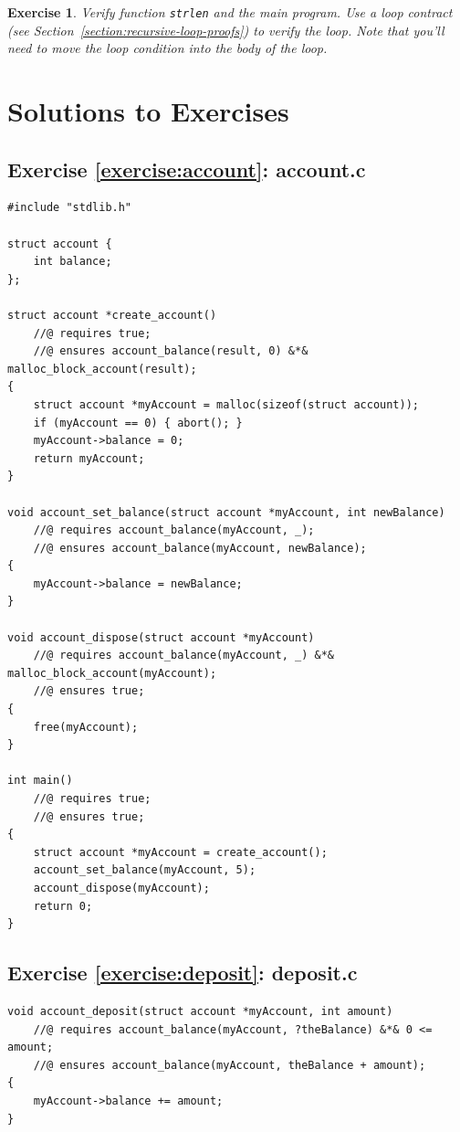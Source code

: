\documentclass{article}
\newtheorem{exercise}{Exercise}
\begin{document}
\begin{exercise}\label{exercise:strlen}
Verify function \lstinline!strlen! and the main program. Use a loop contract (see Section~\ref{section:recursive-loop-proofs}) to verify the loop.
Note that you'll need to move the loop condition into the body of the loop.
\end{exercise}

\section{Solutions to Exercises}

\subsection{Exercise \ref{exercise:account}: account.c}

\begin{lstlisting}
#include "stdlib.h"

struct account {
    int balance;
};

struct account *create_account()
    //@ requires true;
    //@ ensures account_balance(result, 0) &*& malloc_block_account(result);
{
    struct account *myAccount = malloc(sizeof(struct account));
    if (myAccount == 0) { abort(); }
    myAccount->balance = 0;
    return myAccount;
}

void account_set_balance(struct account *myAccount, int newBalance)
    //@ requires account_balance(myAccount, _);
    //@ ensures account_balance(myAccount, newBalance);
{
    myAccount->balance = newBalance;
}

void account_dispose(struct account *myAccount)
    //@ requires account_balance(myAccount, _) &*& malloc_block_account(myAccount);
    //@ ensures true;
{
    free(myAccount);
}

int main()
    //@ requires true;
    //@ ensures true;
{
    struct account *myAccount = create_account();
    account_set_balance(myAccount, 5);
    account_dispose(myAccount);
    return 0;
}
\end{lstlisting}

\subsection{Exercise \ref{exercise:deposit}: deposit.c}

\begin{lstlisting}
void account_deposit(struct account *myAccount, int amount)
    //@ requires account_balance(myAccount, ?theBalance) &*& 0 <= amount;
    //@ ensures account_balance(myAccount, theBalance + amount);
{
    myAccount->balance += amount;
}
\end{lstlisting}
\end{document}
